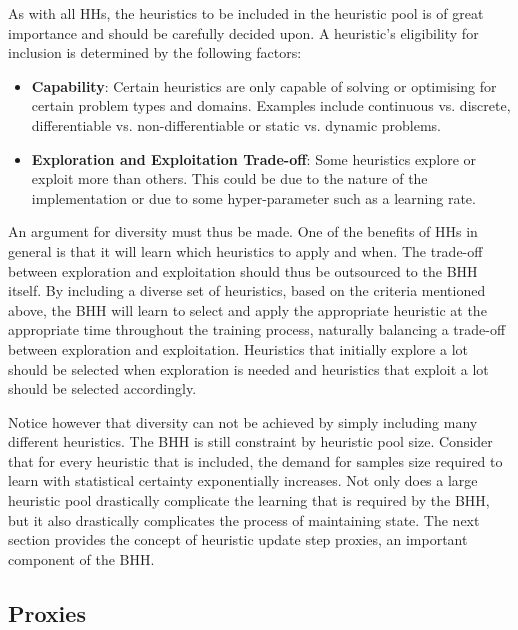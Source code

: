 As with all \acp{HH}, the heuristics to be included in the heuristic pool is of great importance and should be carefully decided upon. A heuristic's eligibility for inclusion is determined by the following factors:

\begin{itemize}
    \item \textbf{Capability}: Certain heuristics are only capable of solving or optimising for certain problem types and domains. Examples include continuous vs. discrete, differentiable vs.  non-differentiable or static vs. dynamic problems. 
    
    \item \textbf{Exploration and Exploitation Trade-off}: Some heuristics explore or exploit more than others. This could be due to the nature of the implementation or due to some hyper-parameter such as a learning rate.
\end{itemize}

An argument for diversity must thus be made. One of the benefits of \acp{HH} in general is that it will learn which heuristics to apply and when. The trade-off between exploration and exploitation should thus be outsourced to the \ac{BHH} itself. By including a diverse set of heuristics, based on the criteria mentioned above, the \ac{BHH} will learn to select and apply the appropriate heuristic at the appropriate time throughout the training process, naturally balancing a trade-off between exploration and exploitation. Heuristics that initially explore a lot should be selected when exploration is needed and heuristics that exploit a lot should be selected accordingly.

Notice however that diversity can not be achieved by simply including many different heuristics. The \ac{BHH} is still constraint by heuristic pool size. Consider that for every heuristic that is included, the demand for samples size required to learn with statistical certainty exponentially increases. Not only does a large heuristic pool drastically complicate the learning that is required by the \ac{BHH}, but it also drastically complicates the process of maintaining state. The next section provides the concept of heuristic update step proxies, an important component of the \ac{BHH}.

\subsection{Proxies}
\label{sec:bhh:heuristic:proxies}

